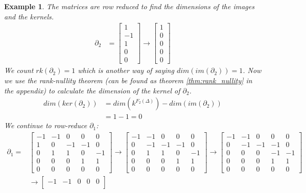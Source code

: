 \documentclass[11pt,a4paper,twoside]{report}
\newtheorem{myex}[mythm]{Example}
\begin{document}
\begin{myex}
The matrices are row reduced to find the dimensions of the images and the kernels.
\begin{align*}
\partial_2&= 
\begin{bmatrix}
1\\
-1\\
1\\
0\\
0
\end{bmatrix}
\to
\begin{bmatrix}
1\\
0\\
0\\
0\\
0
\end{bmatrix}
\end{align*}
We count $rk(\partial_2)=1$ which is another way of saying $dim(im(\partial_2))=1$. Now we use the rank-nullity theorem (can be found as theorem \ref{thm:rank_nullity} in the appendix) to calculate the dimension of the kernel of $\partial_2$.
\begin{align*}
dim(ker(\partial_2))&=dim(k^{F_2(\Delta)})-dim(im(\partial_2))\\
&=1-1= 0
\end{align*}
We continue to row-reduce $\partial_1$:
\begin{align*}
\partial_1=&
\begin{bmatrix}
-1 & -1 & 0 & 0 & 0\\
1 & 0 & -1 & -1 & 0\\
0 & 1 & 1 & 0 & -1\\
0 & 0 & 0 & 1 & 1\\
0 & 0 & 0 & 0 & 0
\end{bmatrix}
\to
\begin{bmatrix}
-1 & -1 & 0 & 0 & 0\\
0 & -1 & -1 & -1 & 0\\
0 & 1 & 1 & 0 & -1\\
0 & 0 & 0 & 1 & 1\\
0 & 0 & 0 & 0 & 0
\end{bmatrix}
\to
\begin{bmatrix}
-1 & -1 & 0 & 0 & 0\\
0 & -1 & -1 & -1 & 0\\
0 & 0 & 0 & -1 & -1\\
0 & 0 & 0 & 1 & 1\\
0 & 0 & 0 & 0 & 0
\end{bmatrix}\\
&\to
\begin{bmatrix}
-1 & -1 & 0 & 0 & 0\\

\end{bmatrix}
\end{align*}
\end{myex}
\end{document}
